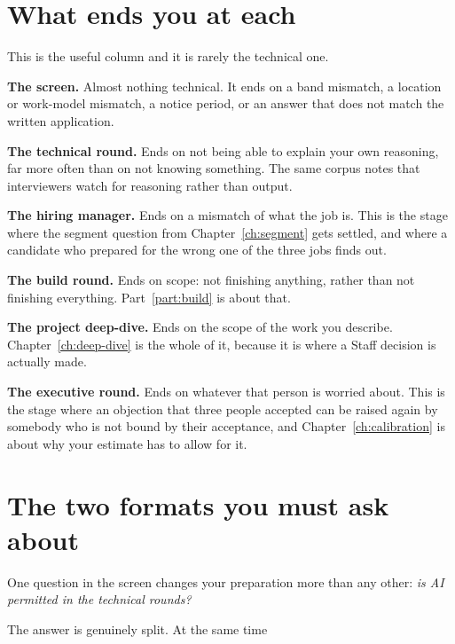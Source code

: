 \section{What ends you at each}

This is the useful column and it is rarely the technical one.

\textbf{The screen.} Almost nothing technical. It ends on a band mismatch, a
location or work-model mismatch, a notice period, or an answer that does not
match the written application. 

\textbf{The technical round.} Ends on not being able to explain your own
reasoning, far more often than on not knowing something. The same corpus notes
that interviewers watch for reasoning rather than
output.

\textbf{The hiring manager.} Ends on a mismatch of what the job is. This is the
stage where the segment question from Chapter~\ref{ch:segment} gets settled,
and where a candidate who prepared for the wrong one of the three jobs finds
out.

\textbf{The build round.} Ends on scope: not finishing anything, rather than
not finishing everything. Part~\ref{part:build} is about that.

\textbf{The project deep-dive.} Ends on the scope of the work you describe.
Chapter~\ref{ch:deep-dive} is the whole of it, because it is where a Staff
decision is actually made.

\textbf{The executive round.} Ends on whatever that person is worried about.
This is the stage where an objection that three people accepted can be raised
again by somebody who is not bound by their acceptance, and
Chapter~\ref{ch:calibration} is about why your estimate has to allow for it.

\section{The two formats you must ask about}

One question in the screen changes your preparation more than any other:
\emph{is AI permitted in the technical rounds?}

The answer is genuinely split.  At the same time

